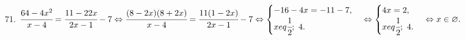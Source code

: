 71. $\cfrac{64-4x^2}{x-4}=\cfrac{11-22x}{2x-1}-7\Leftrightarrow
\cfrac{(8-2x)(8+2x)}{x-4}=\cfrac{11(1-2x)}{2x-1}-7\Leftrightarrow
\begin{cases} -16-4x=-11-7,\\ x
eq\cfrac{1}{2};\ 4.\end{cases}\Leftrightarrow
\begin{cases} 4x=2,\\ x
eq\cfrac{1}{2};\ 4.\end{cases}\Leftrightarrow x\in\varnothing.$\\
